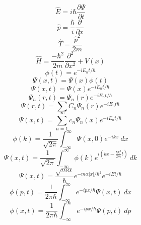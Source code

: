 \documentclass[10pt]{article}
\begin{document}
\begin{multicols}{3}
\begin{equation*}
\end{equation*}
\begin{equation*}
\hat{E}=i\hbar\frac{\partial \Psi}{\partial t}
\end{equation*}
\begin{equation*}
\hat{p}=\frac{\hbar}{i}\frac{\partial}{\partial x}
\end{equation*}
\begin{equation*}
\hat{T}=\frac{\hat{p}^2}{2m}
\end{equation*}
\begin{equation*}
\hat{H}=\frac{-\hbar^2}{2m}\frac{\partial^2}{\partial x^2}+V(x)
\end{equation*}
\begin{equation*}
\phi(t)=e^{-iE_nt/\hbar}
\end{equation*}
\begin{equation*}
\Psi(x,t)=\Psi(x)\phi(t)
\end{equation*}
\begin{equation*}
\Psi(x,t)=\Psi(x)e^{-iE_nt/\hbar}
\end{equation*}
\begin{equation*}
\Psi_n(r,t)=\Psi_n(r)e^{-iE_nt/\hbar}
\end{equation*}
\begin{equation*}
\Psi(r,t)=\sum C_n\Psi_n(r)e^{-iE_nt\hbar}
\end{equation*}
\begin{equation*}
\Psi(x,t)=\sum_{n=1}^{\infty}c_n\Psi_n(x)e^{-iE_nt/\hbar}
\end{equation*}
\begin{equation*}
\phi(k)=\frac{1}{\sqrt{2\pi}}\int_{-\infty}^{\infty}\Psi(x,0)e^{-ikx} \ dx
\end{equation*}
\begin{equation*}
\Psi(x,t)=\frac{1}{\sqrt{2\pi}}\int_{-\infty}^{\infty}\phi(k)e^{i\left(kx-\frac{\hbar k^2}{2m}t\right)} \ dk
\end{equation*}
\begin{equation*}
\Psi(x,t)=\frac{\sqrt{m\alpha}}{\hbar}e^{-m\alpha|x|/\hbar^2}e^{-iEt/\hbar}
\end{equation*}
\begin{equation*}
\phi(p,t)=\frac{1}{2\pi\hbar}\int_{-\infty}^{\infty}e^{-ipx/\hbar}\Psi(x,t) \ dx
\end{equation*}
\begin{equation*}
\phi(x,t)=\frac{1}{2\pi\hbar}\int_{-\infty}^{\infty}e^{-ipx/\hbar}\Psi(p,t) \ dp
\end{equation*}

\end{multicols}
\end{document}
